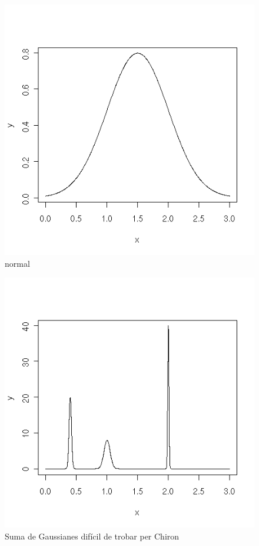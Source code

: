 \begin{figure}[h]
	\begin{center}
		\includegraphics[scale=0.5]{chiron/normal.png}
	\end{center}
	\caption{normal}
	\label{fig:normal}
\end{figure}

\begin{figure}[h]
	\begin{center}
		\includegraphics[scale=0.5]{chiron/pics.png}
	\end{center}
	\caption{Suma de Gaussianes difícil de trobar per Chiron} 
	\label{fig:dificil}
\end{figure} 

